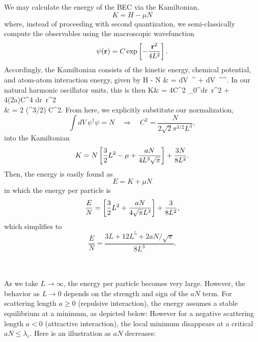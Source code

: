 \documentclass[10pt,letterpaper]{article}
\newcommand{\ve}{\textbf }
\begin{document}
\eenum
\benum
\item
We may calculate the energy of the BEC via the Kamiltonian,
\[
	K = H - \mu N
\]
where, instead of proceeding with second quantization, we semi-classically compute the observables using the macroscopic wavefunction 
\[
	\psi(\vect r) = C \exp\left[-\frac{\ve r^2}{4L^2}\right].
\]
 Accordingly, the Kamiltonian consists of the kinetic energy, chemical potential,
and atom-atom interaction energy, given by
\ba
	H - \mu N
	& = \int dV\  \psi^\dag {}\psi
	+  \int dV\ \psi^\dag \psi^\dag \psi\psi.
\ea
In our natural harmonic oscillator units, this is then
\ba
    	K& = 4\pi C^2 \int_0^\infty dr\ r^2 + 4\pi (2\pi a)C^4 \int dr\ r^2  \exp{} \\
	& = 2 (\pi^{3/2}) C^2\blr{ L^3\plr{ \frac{3}{2}L^2 - \mu+\frac{\sqrt 2}{2}\pi aC^2} + \frac{3}{8}L}.
\ea
From here, we explicitly substitute our normalization,
\[
	\int dV\ \psi^\dag \psi = N\quad\Rightarrow\quad C^2 = \frac{N}{2\sqrt 2 \pi^{3/2}L^3},
\]
into the Kamiltonian 
\[
	K = N\left[ \frac{3}{2}L^2- \mu+\frac{aN}{4L^3\sqrt \pi}\right]+ \frac{3N}{8L^2}.
\]
Then, the energy is easily found as
\[
	E = K +\mu N
\]
in which the energy per particle is
\[
	\frac{E}{N} = \left[ \frac{3}{2}L^2+\frac{aN}{4\sqrt\pi L^3}\right]+\frac{3}{8L^2},
\]
which simplifies to
\[
	\boxed{\frac{E}{N}=\frac{3L+12L^5+2aN/\sqrt{\pi}}{8L^3}}.
\]
\\ \\
\item
As we take $L\to \infty$, the energy per particle becomes very large. However, the behavior as $L\to 0$
depends on the strength and sign of the $aN$ term. For scattering length $a\ge0$ (repulsive interaction),
the energy assumes a stable equilibrium at a minimum, as depicted below:
However for a negative scattering length $a<0$ (attractive interaction), the local minimum disappears at a critical $aN\le \lambda_c$. 
Here is an illustration as $aN$ decreases:
\end{document}
